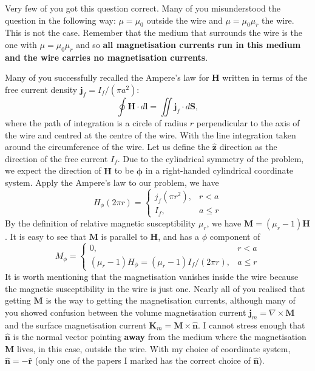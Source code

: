\documentclass[a4paper]{article}
\begin{document}
Very few of you got this question correct. Many of you misunderstood the question in the following way: $\mu = \mu_0$ outside the wire and  $\mu = \mu_0 \mu_r$ the wire. This is not the case.
Remember that the medium that surrounds the wire is the one with $\mu = \mu_0 \mu_r$ and so \textbf {all magnetisation currents run in this medium and the wire carries no magnetisation currents}.

Many of you successfully recalled the Ampere's law for $\mathbf{H}$ written in terms of the free current density $\mathbf{j}_f = I_f/(\pi a^2)$:
\[
\oint \mathbf{H} \cdot d \mathbf{l} = \iint \mathbf{j}_f \cdot d \mathbf{S}
,\] 
where the path of integration is a circle of radius $r$ perpendicular to the axis of the wire and centred at the centre of the wire.
With the line integration taken around the circumference of the wire.
Let us define the $\mathbf{\hat{z}}$ direction as the direction of the free current $I_f$.
Due to the cylindrical symmetry of the problem, we expect the direction of $\mathbf{H}$ to be $\hat{\mathbf{\phi}}$ in a right-handed cylindrical coordinate system.
Apply the Ampere's law to our problem, we have
\[
    H_\phi (2 \pi r) = \left\{\begin{array}{lr}
        j_f (\pi r^2), & r < a \\
        I_f, & a \leq r
\end{array}\right
.\] 
By the definition of relative magnetic susceptibility $\mu_r$, we have  $\mathbf{M} = (\mu_r-1) \mathbf{H}$. It is easy to see that $\mathbf{M}$ is parallel to $\mathbf{H}$, and has a $\phi$ component of
\[
    M_\phi = \left\{ \begin{array}{lr}
            0, & r < a \\
            (\mu_r - 1) H_\phi = (\mu_r - 1) I_f/(2 \pi r), & a \leq r
    \end{array} \right
.\] 
It is worth mentioning that the magnetisation vanishes inside the wire because the magnetic susceptibility in the wire is just one.
Nearly all of you realised that getting $\mathbf{M}$ is the way to getting the magnetisation currents, although many of you showed confusion between the volume magnetisation current $\mathbf{j}_m = \nabla \times \mathbf{M}$ and the surface magnetisation current $\mathbf{K}_m = \mathbf{M} \times \mathbf{\hat{n}}$. I cannot stress enough that $\mathbf{\hat{n}}$ is the normal vector pointing \textbf{away} from the medium where the magnetisation $\mathbf{M}$ lives, in this case, outside the wire. With my choice of coordinate system, $\mathbf{\hat{n}} = - \mathbf{\hat{r}}$ (only one of the papers I marked has the correct choice of $\mathbf{\hat{n}}$).
\end{document}
